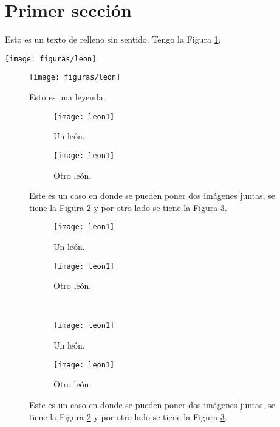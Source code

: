 \documentclass[12pt]{article}
\begin{document}
\section{Primer sección}

Esto es un texto de relleno sin sentido. Tengo la Figura \ref{fig:leon}.

\texttt{[image: figuras/leon]}

\begin{figure}[h]
	\centering
	\texttt{[image: figuras/leon]}
	\caption{Esto es una leyenda.}
	\label{fig:leon}
\end{figure}

\begin{figure}[h]
	\centering
	\begin{subfigure}{.45\textwidth}
		\centering
		\texttt{[image: leon1]}%
		\caption{Un león.}
		\label{fig:leon1}
	\end{subfigure} 
	\hfil
	\begin{subfigure}{.45\textwidth}
		\centering
		\texttt{[image: leon1]}%
		\caption{Otro león.}
		\label{fig:leon2}
	\end{subfigure}
	\caption{Este es un caso en donde se pueden poner dos imágenes juntas, se tiene la Figura \ref{fig:leon1} y por otro lado se tiene la Figura \ref{fig:leon2}.}
	\label{fig:leones}
\end{figure}

\begin{figure}[h]
	\centering
	\begin{subfigure}{.45\textwidth}
		\centering
		\texttt{[image: leon1]}%
		\caption{Un león.}
	\end{subfigure} 
	\hfil
	\begin{subfigure}{.45\textwidth}
		\centering
		\texttt{[image: leon1]}%
		\caption{Otro león.}
	\end{subfigure} \\
	\begin{subfigure}{.45\textwidth}
		\centering
		\texttt{[image: leon1]}%
		\caption{Un león.}
	\end{subfigure} 
	\hfil
	\begin{subfigure}{.45\textwidth}
		\centering
		\texttt{[image: leon1]}%
		\caption{Otro león.}
	\end{subfigure}
	\caption{Este es un caso en donde se pueden poner dos imágenes juntas, se tiene la Figura \ref{fig:leon1} y por otro lado se tiene la Figura \ref{fig:leon2}.}
	\label{fig:leones2}
\end{figure}
\newpage
\end{document}
